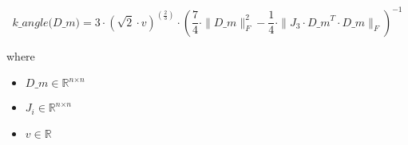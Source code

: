 \documentclass[12pt]{article}
\begin{document}
\[
\textit{k\_angle(D\_m)} = 3 \cdot ( \sqrt{2} \cdot \textit{v})^{(\frac{2}{3})} \cdot (\frac{7}{4} \cdot \|\textit{D\_m}\|_F^{2} - \frac{1}{4} \cdot \|\textit{J}_{ 3 } \cdot \textit{D\_m}^T \cdot \textit{D\_m}\|_F)^{-1}
\]

where
\begin{itemize}
\item $\textit{D\_m} \in \mathbb{R}^{ \textit{n} \times \textit{n} }$
\item $\textit{J}_{\textit{i}} \in \mathbb{R}^{ \textit{n} \times \textit{n} }$
\item $\textit{v} \in \mathbb{{R}}$
\end{itemize}
\end{document}
